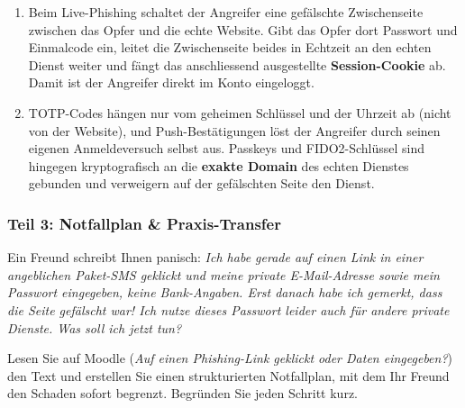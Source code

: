 \documentclass[12pt,a4paper]{article}
\begin{document}
\begin{solutionbox}
\begin{enumerate}[label=\alph*)]
    \item Beim Live-Phishing schaltet der Angreifer eine gefälschte Zwischenseite zwischen das Opfer und die echte Website. Gibt das Opfer dort Passwort und Einmalcode ein, leitet die Zwischenseite beides in Echtzeit an den echten Dienst weiter und fängt das anschliessend ausgestellte \textbf{Session-Cookie} ab. Damit ist der Angreifer direkt im Konto eingeloggt.
    \item TOTP-Codes hängen nur vom geheimen Schlüssel und der Uhrzeit ab (nicht von der Website), und Push-Bestätigungen löst der Angreifer durch seinen eigenen Anmeldeversuch selbst aus. Passkeys und FIDO2-Schlüssel sind hingegen kryptografisch an die \textbf{exakte Domain} des echten Dienstes gebunden und verweigern auf der gefälschten Seite den Dienst.
\end{enumerate}
\end{solutionbox}

\newpage
\subsubsection{Teil 3: Notfallplan \& Praxis-Transfer}
\begin{taskbox}
Ein Freund schreibt Ihnen panisch: \textit{Ich habe gerade auf einen Link in einer angeblichen Paket-SMS geklickt und meine private E-Mail-Adresse sowie mein Passwort eingegeben, keine Bank-Angaben. Erst danach habe ich gemerkt, dass die Seite gefälscht war! Ich nutze dieses Passwort leider auch für andere private Dienste. Was soll ich jetzt tun?}

Lesen Sie auf Moodle (\textit{Auf einen Phishing-Link geklickt oder Daten eingegeben?}) den Text und erstellen Sie einen strukturierten Notfallplan, mit dem Ihr Freund den Schaden sofort begrenzt. Begründen Sie jeden Schritt kurz.
\end{taskbox}
\end{document}

